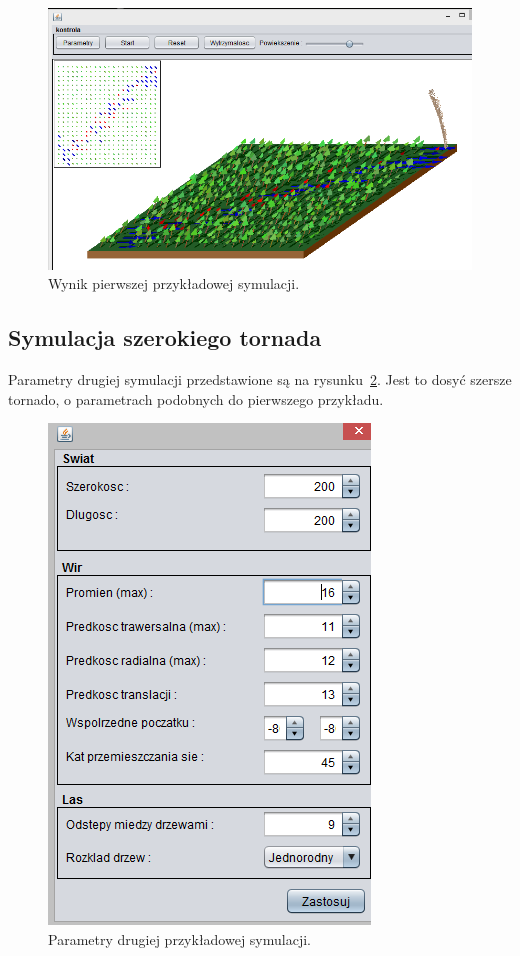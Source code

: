 \begin{figure}[!h]
	\center
	\includegraphics[scale=0.62]{test1}
	\caption{Wynik pierwszej przykładowej symulacji.}
	\label{fig:test1}
\end{figure} 

\subsection{Symulacja szerokiego tornada}

Parametry drugiej symulacji przedstawione są na rysunku~\ref{fig:test2p}. Jest to dosyć szersze tornado, o parametrach podobnych do pierwszego przykładu.

\begin{figure}[!h]
	\center
	\includegraphics[scale=0.7]{test2p}
	\caption{Parametry drugiej przykładowej symulacji.}
	\label{fig:test2p}
\end{figure} 

